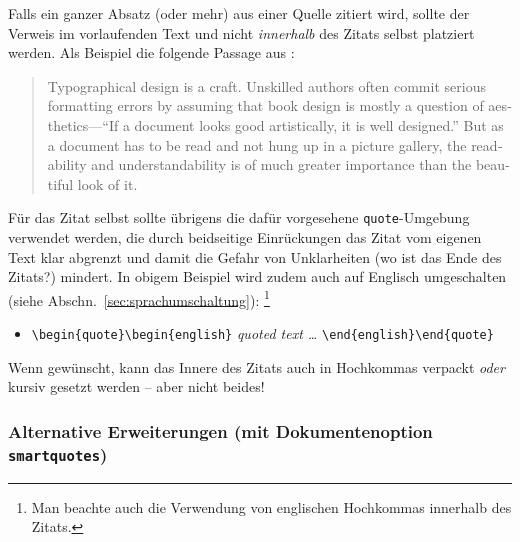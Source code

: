 Falls ein ganzer Absatz (oder mehr) aus einer Quelle zitiert wird, sollte der
Verweis im vorlaufenden Text und nicht \emph{innerhalb} des Zitats selbst
platziert werden. Als Beispiel die folgende Passage aus \cite{Oetiker2021}:
%
\begin{quote}
    \begin{english}
        Typographical design is a craft. Unskilled authors often
        commit serious formatting errors by assuming that book
        design is mostly a question of aesthetics---``If a document
        looks good artistically, it is well designed.'' But as a
        document has to be read and not hung up in a picture
        gallery, the readability and understandability is of much
        greater importance than the beautiful look of it.
    \end{english}
\end{quote}
%
Für das Zitat selbst sollte übrigens die dafür vorgesehene
\texttt{quote}-Umgebung verwendet werden, die durch beidseitige Einrückungen
das Zitat vom eigenen Text klar abgrenzt und damit die Gefahr von
Unklarheiten (wo ist das Ende des Zitats?) mindert. In obigem Beispiel wird
zudem auch auf Englisch umgeschalten (siehe Abschn.\
\ref{sec:sprachumschaltung}):%
\footnote{Man beachte auch die Verwendung von englischen Hochkommas innerhalb
des Zitats.}
%
\begin{itemize}
    \item[] \verb!\begin{quote}\begin{english}! \emph{quoted text \ldots}
    \verb!\end{english}\end{quote}!
\end{itemize}
%
Wenn gewünscht, kann das Innere des Zitats auch in Hochkommas verpackt
\emph{oder} kursiv gesetzt werden -- aber nicht beides!

\subsubsection{Alternative Erweiterungen (mit Dokumentenoption
\texttt{smartquotes})}

